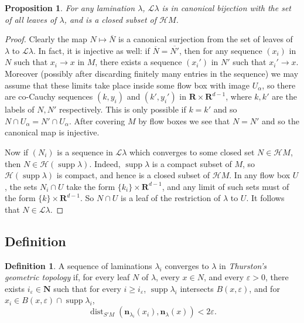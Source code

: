 \documentclass[reqno,11pt]{amsart}
\newcommand{\NN}{\mathbf{N}}
\newcommand{\RR}{\mathbf{R}}
\DeclareMathOperator{\dist}{dist}
\DeclareMathOperator{\supp}{supp}
\newcommand{\Leaves}{\mathscr L}
\newcommand{\Hypspace}{\mathscr H}
\newcommand{\normal}{\mathbf n}
\newcommand{\dfn}[1]{\emph{#1}\index{#1}}
\newtheorem{proposition}[theorem]{Proposition}
\theoremstyle{definition}
\newtheorem{definition}[theorem]{Definition}
\numberwithin{equation}{section}
\begin{document}
\begin{proposition}
For any lamination $\lambda$, $\Leaves \lambda$ is in canonical bijection with the set of all leaves of $\lambda$, and is a closed subset of $\Hypspace M$.
\end{proposition}
\begin{proof}
Clearly the map $N \mapsto \overline N$ is a canonical surjection from the set of leaves of $\lambda$ to $\Leaves \lambda$.
In fact, it is injective as well: if $\overline N = \overline{N'}$, then for any sequence $(x_i)$ in $N$ such that $x_i \to x$ in $M$, there exists a sequence $(x_i')$ in $N'$ such that $x_i' \to x$.
Moreover (possibly after discarding finitely many entries in the sequence) we may assume that these limits take place inside some flow box with image $U_\alpha$, so there are co-Cauchy sequences $(k, y_i)$ and $(k', y_i')$ in $\RR \times \RR^{d - 1}$, where $k, k'$ are the labels of $N, N'$ respectively.
This is only possible if $k = k'$ and so $N \cap U_\alpha = N' \cap U_\alpha$.
After covering $M$ by flow boxes we see that $N = N'$ and so the canonical map is injective.

Now if $(N_i)$ is a sequence in $\Leaves \lambda$ which converges to some closed set $N \in \Hypspace M$, then $N \in \Hypspace(\supp \lambda)$.
Indeed, $\supp \lambda$ is a compact subset of $M$, so $\Hypspace(\supp \lambda)$ is compact, and hence is a closed subset of $\Hypspace M$.
In any flow box $U$, the sets $N_i \cap U$ take the form $\{k_i\} \times \RR^{d - 1}$, and any limit of such sets must of the form $\{k\} \times \RR^{d - 1}$.
So $N \cap U$ is a leaf of the restriction of $\lambda$ to $U$.
It follows that $N \in \Leaves \lambda$.
\end{proof}

\subsection{Definition}

\begin{definition}
A sequence of laminations $\lambda_i$ converges to $\lambda$ in \dfn{Thurston's geometric topology} if, for every leaf $N$ of $\lambda$, every $x \in N$, and every $\varepsilon > 0$, there exists $i_\varepsilon \in \NN$ such that for every $i \geq i_\varepsilon$, $\supp \lambda_i$ intersects $B(x, \varepsilon)$, and for $x_i \in B(x, \varepsilon) \cap \supp \lambda_i$,
\begin{equation}\label{convergence of normals}
\dist_{S' M}(\normal_{\lambda_i}(x_i), \normal_\lambda(x)) < 2\varepsilon.
\end{equation}
\end{definition}
\end{document}
